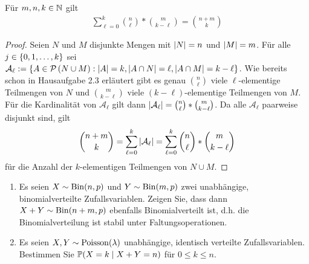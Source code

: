 \begin{exercisePage}
	
	\begin{lemma} \label{lemma: 4_1_vandermonde}
		Für $m,n,k \in \N$ gilt \vspace{-\baselineskip}
		\begin{align} 
			\sum_{\ell = 0}^k \binom{n}{\ell} * \binom{m}{k - \ell} = \binom{n+m}{k}
			\label{eq: 4_1_vandermode}
		\end{align}
	\end{lemma}
	\begin{proof}
		Seien $N$ und $M$ disjunkte Mengen mit $\card{N} = n$ und $\card{M} = m$. Für alle $j \in \menge{0,1,\dots,k}$ sei $\mathcal{A}_\ell \defeq \menge{A \in \pows{N \cup M} : \card{A} = k , \card{A \cap N} = \ell , \card{A \cap M} = k- \ell}$. Wie bereits schon in Hausaufgabe 2.3 erläutert gibt es genau $\binom{n}{\ell}$ viele $\ell$-elementige Teilmengen von $N$ und $\binom{m}{k-\ell}$ viele $(k-\ell)$-elementige Teilmengen von $M$. Für die Kardinalität von $\mathcal{A}_\ell$ gilt dann $\card{\mathcal{A}_\ell} = \binom{n}{\ell} * \binom{m}{k-\ell}$. Da alle $\mathcal{A}_\ell$ paarweise disjunkt sind, gilt
		\begin{equation*}
			\binom{n+m}{k} = \sum_{\ell = 0}^k \card{\mathcal{A}_\ell} = \sum_{\ell = 0}^k \binom{n}{\ell} * \binom{m}{k-\ell}
		\end{equation*}
		für die Anzahl der $k$-elementigen Teilmengen von $N \cup M$.
	\end{proof}
	\begin{homework}
		\begin{enumerate}[leftmargin=*]
			\item Es seien $X \sim \Bin(n,p)$ und $Y \sim \Bin(m,p)$ zwei unabhängige, binomialverteilte Zufallsvariablen. Zeigen Sie, dass dann $X+Y \sim \Bin(n+m , p)$ ebenfalls Binomialverteilt ist, d.h. die Binomialverteilung ist stabil unter Faltungsoperationen.
			\item Es seien $X,Y \sim \Poisson(\lambda)$ unabhängige, identisch verteilte Zufallsvariablen. Bestimmen Sie $\P(X=k \mid X+Y = n)$ für $0 \leq k \leq n$.
		\end{enumerate}
	\end{homework}


\end{exercisePage}
